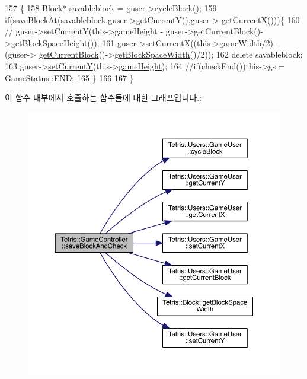 \begin{DoxyCode}
157                                                               \{
158                 \hyperlink{class_tetris_1_1_block}{Block}* savableblock = guser->\hyperlink{class_tetris_1_1_users_1_1_game_user_a5efbd1ed9fa84a4041c218fb32463c36}{cycleBlock}();
159                 \textcolor{keywordflow}{if}(\hyperlink{class_tetris_1_1_game_controller_adc067380df0f0da4ea4a358d00d6a123}{saveBlockAt}(savableblock,guser->\hyperlink{class_tetris_1_1_users_1_1_game_user_af5bd7ff0b575af1b42b093488cff97e2}{getCurrentY}(),guser->
      \hyperlink{class_tetris_1_1_users_1_1_game_user_ad25eace96bd27ae6df4a0c0d506be730}{getCurrentX}()))\{
160                        \textcolor{comment}{// guser->setCurrentY(this->gameHeight -
       guser->getCurrentBlock()->getBlockSpaceHeight());}
161                         guser->\hyperlink{class_tetris_1_1_users_1_1_game_user_a2957358b1a6298f06c6c2e10cb89f623}{setCurrentX}((this->\hyperlink{class_tetris_1_1_game_controller_a439f215918db4127fcb44cf9d501ed63}{gameWidth}/2) - (guser->
      \hyperlink{class_tetris_1_1_users_1_1_game_user_a3d4bcc74d518c28356012f8a42b85896}{getCurrentBlock}()->\hyperlink{class_tetris_1_1_block_ac390e14de476582300d815d9054ed9bd}{getBlockSpaceWidth}()/2));
162                         \textcolor{keyword}{delete} savableblock;
163                         guser->\hyperlink{class_tetris_1_1_users_1_1_game_user_aeedbe521004c22018b73a509e99f7d81}{setCurrentY}(this->\hyperlink{class_tetris_1_1_game_controller_a8e3adc647ed382de0ff541417bea9b33}{gameHeight});
164                         \textcolor{comment}{//if(checkEnd())this->gs = GameStatus::END;}
165                 \}
166                 
167             \}
\end{DoxyCode}
이 함수 내부에서 호출하는 함수들에 대한 그래프입니다.\+:
\nopagebreak
\begin{figure}[H]
\begin{center}
\leavevmode
\includegraphics[width=350pt]{db/dd2/class_tetris_1_1_game_controller_a3c63a9754e4cbeae4f66a5760bb4055d_cgraph}
\end{center}
\end{figure}
